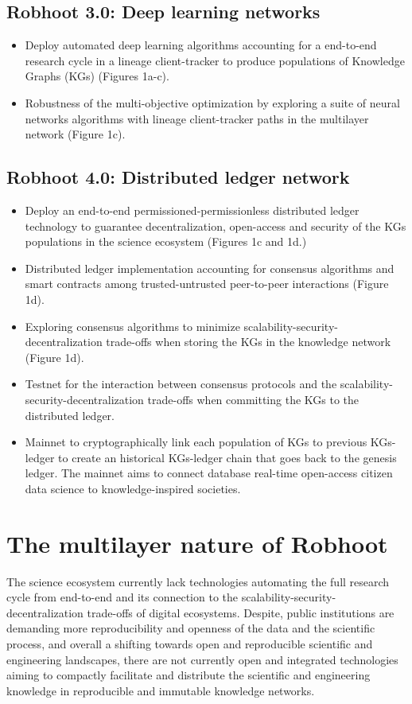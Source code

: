 \documentclass[10pt, a4paper, twocolumn]{article} %
\begin{document}
  \subsection{Robhoot 3.0: Deep learning networks}
  \begin{itemize}
  \item Deploy automated deep learning algorithms accounting for a
    end-to-end research cycle in a lineage client-tracker to produce
    populations of Knowledge Graphs (KGs) (Figures 1a-c).
  \item Robustness of the multi-objective optimization by exploring a
    suite of neural networks algorithms with lineage client-tracker
    paths in the multilayer network (Figure 1c).
  \end{itemize}
  \vspace{-0.15 in}
  
  \subsection{Robhoot 4.0: Distributed ledger network}
  \begin{itemize}
  \item Deploy an end-to-end permissioned-permissionless distributed
    ledger technology to guarantee decentralization, open-access and
    security of the KGs populations in the science ecosystem (Figures
    1c and 1d.)
  \item Distributed ledger implementation accounting for consensus
    algorithms and smart contracts among trusted-untrusted
    peer-to-peer interactions (Figure 1d).
  \item Exploring consensus algorithms to minimize
    scalability-security-decentralization trade-offs when storing the
    KGs in the knowledge network (Figure 1d).
  \item Testnet for the interaction between consensus protocols and
    the scalability-security-decentralization trade-offs when
    committing the KGs to the distributed ledger.
  \item Mainnet to cryptographically link each population of KGs to
    previous KGs-ledger to create an historical KGs-ledger chain that
    goes back to the genesis ledger. The mainnet aims to connect
    database real-time open-access citizen data science to
    knowledge-inspired societies.
  \end{itemize}
  
  \section{The multilayer nature of Robhoot}
  The science ecosystem currently lack technologies automating the
  full research cycle from end-to-end and its connection to the
  scalability-security-decentralization trade-offs of digital
  ecosystems. Despite, public institutions are demanding more
  reproducibility and openness of the data and the scientific process,
  and overall a shifting towards open and reproducible scientific and
  engineering landscapes, there are not currently open and integrated
  technologies aiming to compactly facilitate and distribute the
  scientific and engineering knowledge in reproducible and immutable
  knowledge networks.
  
\end{document}
